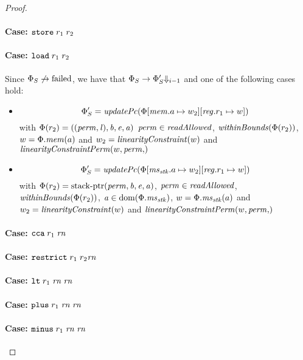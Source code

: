 \documentclass[a4paper]{article}
\begin{document}
\begin{proof}
\paragraph{Case: $\protect\tstore{\trg{r_1}}{\trg{r_2}}$}

\paragraph{Case: $\protect\tload{\trg{r_1}}{\trg{r_2}}$}
Since $\Phi_S\not\step\failed$, we have that $\Phi_S \step \Phi_S' \term[i-1]$ and one of the following cases hold: 
\begin{itemize}
\item \[\Phi_S' = \updPcAddr{\Phi\update{\mem.a}{w_2}\updReg{r_1}{w}}\]
  with $\Phi(r_2) = ((\perm,\lin),\baddr,\eaddr,\aaddr)$ 
  $\perm \in \readAllowed{}$, $\withinBounds{\Phi(r_2)}$, $w = \Phi.\mem(a)$ and $w_2 = \linCons{w}$ and $\linConsPerm{w,\perm}$
\item \[\Phi_S' = \updPcAddr{\Phi \update{\ms_\stk.a}{w_2}\updReg{r_1}{w}}\]
  with $\Phi(r_2) = \stkptr{\perm,\baddr,\eaddr,\aaddr}$, $\perm \in \readAllowed{}$, $\withinBounds{\Phi(r_2)}$, $\aaddr \in \dom(\Phi.\ms_\stk)$, $w = \Phi.\ms_\stk(a)$ and $w_2 = \linCons{w}$ and $\linConsPerm{w,\perm}$
\end{itemize}

\paragraph{Case: $\protect\tcca{\trg{r_1}}{\trg{\rn}}$}

\paragraph{Case: $\protect\trestrict{\trg{r_1}}{\trg{r_2}}{\trg{\rn}}$}

\paragraph{Case: $\protect\tlt{\trg{r_1}}{\trg{\rn}}{\trg{\rn}}$}

\paragraph{Case: $\protect\tplus{\trg{r_1}}{\trg{\rn}}{\trg{\rn}}$}

\paragraph{Case: $\protect\tminus{\trg{r_1}}{\trg{\rn}}{\trg{\rn}}$}


\end{proof}
\end{document}
